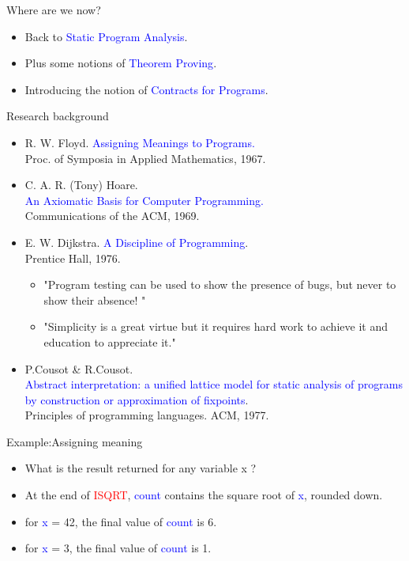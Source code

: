 \begin{frame}{Where are we now?}
\begin{itemize}
	\item Back to \textcolor{blue}{Static Program Analysis}.
	\item Plus some notions of \textcolor{blue}{Theorem Proving}.
	\item Introducing the notion of \textcolor{blue}{Contracts for Programs}.
\end{itemize}
\end{frame}

\begin{frame}{Research background}
\begin{itemize}\setlength\itemsep{1em}
	\item R. W. Floyd. 
 \textcolor{blue}{Assigning Meanings to Programs.}\\ 	Proc. of Symposia in Applied Mathematics, 1967.
	\item C. A. R. (Tony) Hoare.\\ \textcolor{blue}{An Axiomatic Basis for Computer Programming.}\\ Communications of the ACM, 1969.
	\item E. W. Dijkstra. \textcolor{blue}{A Discipline of Programming}.\\ Prentice Hall, 1976.
	\begin{itemize}
		\item "Program testing can be used to show the presence of bugs, but never to show their absence! "
		\item "Simplicity is a great virtue but it requires hard work to achieve it and education to appreciate it."
	\end{itemize}
	\pause
	\item P.Cousot \& R.Cousot.\\ \textcolor{blue}{Abstract interpretation: a unified lattice model for static analysis of programs by construction or approximation of fixpoints}. \\ Principles of programming languages. ACM, 1977.
\end{itemize}
\end{frame}

\begin{frame}{Example:Assigning meaning}
\begin{exampleblock}

\begin{itemize}
\item What is the result returned for any variable x ?


	\pause
	\item At the end of \textcolor{red}{ISQRT}, \textcolor{blue}{count} contains the square root of \textcolor{blue}{x}, rounded down.
	\item for \textcolor{blue}{x} = 42, the final value of \textcolor{blue}{count} is 6.
	\item for \textcolor{blue}{x} = 3, the final value of \textcolor{blue}{count} is 1.
\end{itemize} 
\end{exampleblock}
\end{frame}
